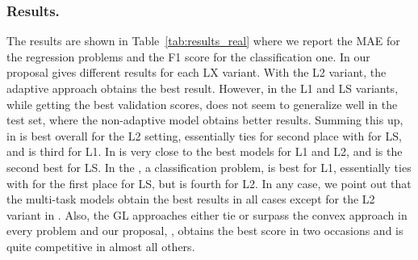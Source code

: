 \subsubsection*{Results.}
The results are shown in Table~\ref{tab:results_real} where we report the MAE for the regression problems and the F1 score for the classification one.
In  our  proposal gives different results for each LX variant. With the L2 variant, the adaptive approach obtains the best result. However, in the L1 and LS variants, while getting the best validation scores,  does not seem to generalize well in the test set, where the non-adaptive  model obtains better results.
Summing this up, in   is best overall for the L2 setting, essentially ties for second place with  for LS, and is third for L1.
In   is very close to the best models for L1 and L2, and is the second best for LS.
In the , a classification problem,  is best for L1, essentially ties with  for the first place for LS, but is fourth for L2.
In any case, we point out that the multi-task models obtain the best results in all cases except for the L2 variant in . Also, the GL approaches either tie or surpass the convex  approach in every problem and our proposal, , obtains the best score in two occasions and is quite competitive in almost all others.

